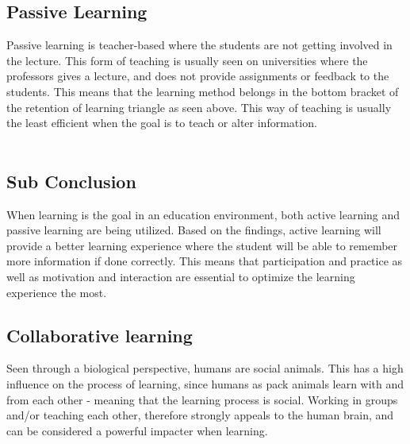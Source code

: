 \subsection*{Passive Learning}
Passive learning is teacher-based where the students are not getting involved in the lecture. This form of teaching is usually seen on universities where the professors gives a lecture, and does not provide assignments or feedback to the students. This means that the learning method belongs in the bottom bracket of the retention of learning triangle as seen above. This way of teaching is usually the least efficient when the goal is to teach or alter information\cite{learning}.\\
\\
\subsection*{Sub Conclusion}
When learning is the goal in an education environment, both active learning and passive learning are being utilized. Based on the findings, active learning will provide a better learning experience where the student will be able to remember more information if done correctly. This means that participation and practice as well as motivation and interaction are essential to optimize the learning experience the most.

\subsection{Collaborative learning}\label{collabLearning}

Seen through a biological perspective, humans are social animals\cite{laeringIPraksis}. This has a high influence on the process of learning, since humans as pack animals learn with and from each other - meaning that the learning process is social\cite{laeringIPraksis}. Working in groups and/or teaching each other, therefore strongly appeals to the human brain, and can be considered a powerful impacter when learning\cite{laeringIPraksis}.        

